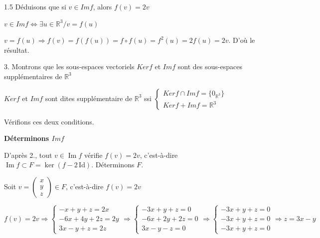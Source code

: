 \documentclass[12pt]{article}
\begin{document}
\begin{spacing}{1.5}
\medskip
Déduisons que si $v\in Imf$, alors $f(v)=2v$

$v\in Imf\Leftrightarrow \exists u\in \mathbb{R}^3/v=f(u)$

$v=f(u)\Rightarrow f(v)=f(f(u))=f\circ f(u)=f^2(u)=2f(u)=2v$. D'où le résultat.

3. Montrons que les sous-espaces vectoriels $Kerf$ et $Imf$ sont des sous-espaces supplémentaires de $\mathbb{R}^3$

$Kerf$ et $Imf$ sont dites supplémentaire de $\mathbb{R}^3$ ssi $\begin{cases}
Kerf\cap Imf=\{0_{\mathbb{R}^3}\}\\
Kerf+Imf=\mathbb{R}^3
\end{cases}$

Vérifions ces deux conditions.

\medskip
\textbf{Déterminons $Imf$}

D'après 2., tout $v\in\operatorname{Im}f$ vérifie $f(v)=2v$, c'est-à-dire $\operatorname{Im}f\subset F=\ker(f-2\,\mathrm{Id})$. Déterminons $F$.

Soit $v=\begin{pmatrix}
x\\
y\\
z
\end{pmatrix}\in F$, c'est-à-dire $f(v)=2v$

$f(v)=2v \Rightarrow \begin{cases}
-x+y+z=2x\\
-6x+4y+2z=2y\\
3x-y+z=2z
\end{cases}\Rightarrow \begin{cases}
-3x+y+z=0\\
-6x+2y+2z=0\\
3x-y-z=0
\end{cases}\Rightarrow \begin{cases}
-3x+y+z=0\\
-3x+y+z=0\\
-3x+y+z=0
\end{cases}\Rightarrow z=3x-y$


\end{spacing}
\end{document}
